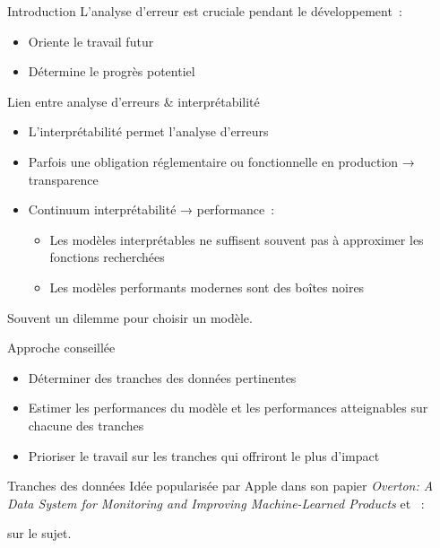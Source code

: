 \begin{frame}{Introduction}
  L'analyse d'erreur est cruciale pendant le développement~:

  \begin{itemize}
    \item Oriente le travail futur
    \item Détermine le progrès potentiel
  \end{itemize}
\end{frame}

\begin{frame}{Lien entre analyse d'erreurs \& interprétabilité}
  \begin{itemize}
    \item L'interprétabilité permet l'analyse d'erreurs
    \item Parfois une obligation réglementaire ou fonctionnelle en production → transparence
    \item Continuum interprétabilité → performance~:
      \begin{itemize}
        \item Les modèles interprétables ne suffisent souvent pas à approximer les fonctions recherchées
        \item Les modèles performants modernes sont des boîtes noires
      \end{itemize}
  \end{itemize}

  Souvent un dilemme pour choisir un modèle.
\end{frame}

\begin{frame}{Approche conseillée}
  \begin{itemize}
    \item Déterminer des tranches des données pertinentes
    \item Estimer les performances du modèle et les performances atteignables sur chacune des tranches
    \item Prioriser le travail sur les tranches qui offriront le plus d'impact
  \end{itemize}
\end{frame}

\begin{frame}{Tranches des données}
  Idée popularisée par Apple dans son papier \textit{Overton: A Data System for Monitoring and Improving Machine-Learned Products} et ~:

   sur le sujet.
\end{frame}

